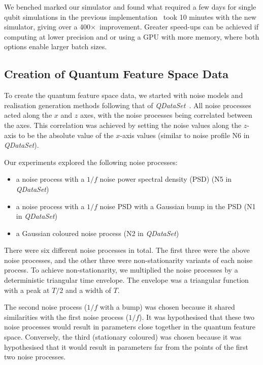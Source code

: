 \documentclass[12pt]{iopart}
\begin{document}
We benched marked our simulator and found what required a few days for single qubit simulations in the previous implementation~\cite{perrier2022qdataset} took 10 minutes with the new simulator, giving over a 400$\times$~improvement. Greater speed-ups can be achieved if computing at lower precision and or using a GPU with more memory, where both options enable larger batch sizes.

\subsection{Creation of Quantum Feature Space Data \label{subsec:creation_of_quantum_feature_space_data}}
To create the quantum feature space data, we started with noise models and realisation generation methods following that of \textit{QDataSet}~\cite{perrier2022qdataset}. All noise processes acted along the $x$ and $z$ axes, with the noise processes being correlated between the axes. This correlation was achieved by setting the noise values along the $z$-axis to be the absolute value of the $x$-axis values (similar to noise profile N6 in \textit{QDataSet}).

Our experiments explored the following noise processes:
\begin{itemize}
    \item a noise process with a $1/f$ noise power spectral density (PSD) (N5 in \textit{QDataSet})
    \item a noise process with a $1/f$ noise PSD with a Gaussian bump in the PSD (N1 in \textit{QDataSet})
    \item a Gaussian coloured noise process (N2 in \textit{QDataSet})
\end{itemize}
There were six different noise processes in total. The first three were the above noise processes, and the other three were non-stationarity variants of each noise process. To achieve non-stationarity, we multiplied the noise processes by a deterministic triangular time envelope. The envelope was a triangular function with a peak at $T/2$ and a width of $T$.

The second noise process ($1/f$ with a bump) was chosen because it shared similarities with the first noise process ($1/f$). It was hypothesised that these two noise processes would result in parameters close together in the quantum feature space. Conversely, the third (stationary coloured) was chosen because it was hypothesised that it would result in parameters far from the points of the first two noise processes.
\end{document}
